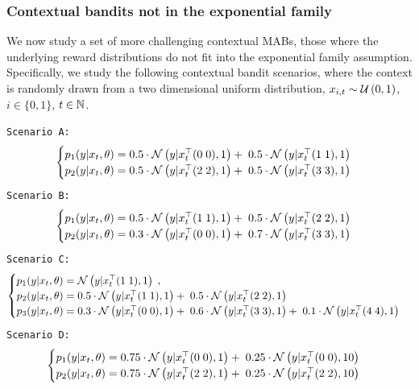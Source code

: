 \subsubsection{Contextual bandits not in the exponential family}
\label{sssec:evaluation_mixture_scenarios_baselines}

We now study a set of more challenging contextual MABs, \ie those where the underlying reward distributions do not fit into the exponential family assumption.
Specifically, we study the following contextual bandit scenarios, where the context is randomly drawn from a two dimensional uniform distribution, \ie $x_{i,t}\sim\mathcal{U}\left( 0,1\right)$, $i\in\{0,1\}$, $t\in {\mathbb N}$.

\texttt{Scenario A:}
\begin{equation}
\begin{cases}
p_{1}(y|x_t,\theta) = 0.5 \cdot \mathcal{N}\left( y|x_t^\top(0 \; 0), 1\right) + \; 0.5 \cdot \mathcal{N}\left( y|x_t^\top(1 \; 1), 1\right)\\
p_{2}(y|x_t,\theta) = 0.5 \cdot \mathcal{N}\left( y|x_t^\top(2 \; 2), 1\right) + \; 0.5 \cdot \mathcal{N}\left( y|x_t^\top(3 \; 3), 1\right)
\end{cases}
\nonumber
\end{equation}
\texttt{Scenario B:}
\begin{equation}
\begin{cases}
p_{1}(y|x_t,\theta) = 0.5 \cdot \mathcal{N}\left( y|x_t^\top(1 \; 1), 1\right) + \; 0.5 \cdot \mathcal{N}\left( y|x_t^\top(2 \; 2), 1\right)\\
p_{2}(y|x_t,\theta) = 0.3 \cdot \mathcal{N}\left( y|x_t^\top(0 \; 0), 1\right) + \; 0.7 \cdot \mathcal{N}\left( y|x_t^\top(3 \; 3), 1\right)
\end{cases}
\nonumber
\end{equation}
\texttt{Scenario C:}
\begin{equation}
\begin{cases}
p_{1}(y|x_t,\theta) = \mathcal{N}\left( y|x_t^\top(1 \; 1), 1\right)\; ,\\
p_{2}(y|x_t,\theta) = 0.5 \cdot \mathcal{N}\left( y|x_t^\top(1 \; 1), 1\right) + \; 0.5 \cdot \mathcal{N}\left( y|x_t^\top(2 \; 2), 1\right)\\
p_{3}(y|x_t,\theta) = 0.3 \cdot \mathcal{N}\left( y|x_t^\top(0 \; 0), 1\right) + \; 0.6 \cdot \mathcal{N}\left( y|x_t^\top(3 \; 3), 1\right) + \; 0.1 \cdot \mathcal{N}\left( y|x_t^\top(4 \; 4), 1\right) 
\end{cases}
\nonumber
\end{equation}
\texttt{Scenario D:}
\begin{equation}
\begin{cases}
p_{1}(y|x_t,\theta) = 0.75 \cdot \mathcal{N}\left( y|x_t^\top(0 \; 0), 1\right) + \; 0.25 \cdot \mathcal{N}\left( y|x_t^\top(0 \; 0), 10\right) \\
p_{2}(y|x_t,\theta) = 0.75 \cdot \mathcal{N}\left( y|x_t^\top(2 \; 2), 1\right) + \; 0.25 \cdot \mathcal{N}\left( y|x_t^\top(2 \; 2), 10\right)
\end{cases}
\nonumber
\end{equation}

